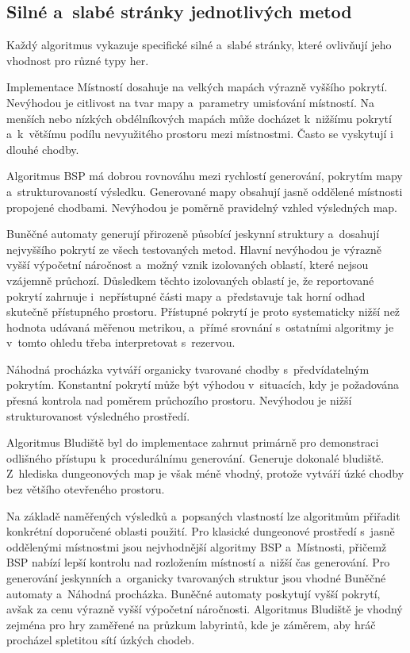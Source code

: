 \documentclass[
   program=itk,
   biblatex,
   figures=true,
   tables=true,
   glossaries,
   index
]{kidiplom}
\begin{document}
\subsection{Silné a~slabé stránky jednotlivých metod}

Každý algoritmus vykazuje specifické silné a~slabé stránky, které ovlivňují jeho vhodnost pro různé typy her.

Implementace Místností dosahuje na velkých mapách výrazně vyššího pokrytí. Nevýhodou je citlivost na tvar mapy a~parametry umisťování místností. Na menších nebo nízkých obdélníkových mapách může docházet k~nižšímu pokrytí a~k~většímu podílu nevyužitého prostoru mezi místnostmi. Často se vyskytují i dlouhé chodby.

Algoritmus BSP má dobrou rovnováhu mezi rychlostí generování, pokrytím mapy a~strukturovaností výsledku. Generované mapy obsahují jasně oddělené místnosti propojené chodbami. Nevýhodou je poměrně pravidelný vzhled výsledných map.

Buněčné automaty generují přirozeně působící jeskynní struktury a~dosahují nejvyššího pokrytí ze všech testovaných metod. Hlavní nevýhodou je výrazně vyšší výpočetní náročnost a~možný vznik izolovaných oblastí, které nejsou vzájemně průchozí. Důsledkem těchto izolovaných oblastí je, že reportované pokrytí zahrnuje i~nepřístupné části mapy a~představuje tak horní odhad skutečně přístupného prostoru. Přístupné pokrytí je proto systematicky nižší než hodnota udávaná měřenou metrikou, a~přímé srovnání s~ostatními algoritmy je v~tomto ohledu třeba interpretovat s~rezervou.

Náhodná procházka vytváří organicky tvarované chodby s~předvídatelným pokrytím. Konstantní pokrytí může být výhodou v~situacích, kdy je požadována přesná kontrola nad poměrem průchozího prostoru. Nevýhodou je nižší strukturovanost výsledného prostředí.

Algoritmus Bludiště byl do implementace zahrnut primárně pro demonstraci odlišného přístupu k~procedurálnímu generování. Generuje dokonalé bludiště. Z~hlediska dungeonových map je však méně vhodný, protože vytváří úzké chodby bez většího otevřeného prostoru.

Na základě naměřených výsledků a~popsaných vlastností lze algoritmům přiřadit konkrétní doporučené oblasti použití. Pro klasické dungeonové prostředí s~jasně oddělenými místnostmi jsou nejvhodnější algoritmy BSP a~Místnosti, přičemž BSP nabízí lepší kontrolu nad rozložením místností a~nižší čas generování. Pro generování jeskynních a~organicky tvarovaných struktur jsou vhodné Buněčné automaty a~Náhodná procházka. Buněčné automaty poskytují vyšší pokrytí, avšak za cenu výrazně vyšší výpočetní náročnosti. Algoritmus Bludiště je vhodný zejména pro hry zaměřené na průzkum labyrintů, kde je záměrem, aby hráč procházel spletitou sítí úzkých chodeb.
\end{document}
